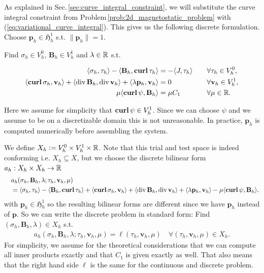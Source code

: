 \documentclass[../master_thesis.tex]{subfiles}
\begin{document}
As explained in Sec.\,\ref{sec:curve_integral_constraint}, 
we will substitute the curve integral constraint from Problem\,\ref{prob:2d_magnetostatic_problem} with 
(\ref{eq:variational_curve_integral}).
This gives us the following discrete formulation. Choose $\mathbf{p}_h \in \mathfrak{H}^1_h$ 
s.t. $\lVert \mathbf{p}_h \rVert = 1$. 

\begin{problem}\label{prob:magnetostatic_problem_discrete_variational}
    Find 
    $\sigma_h \in V_h^0$, $\mathbf{B}_h \in V_h^1$ and $\lambda \in \real$ s.t.

    \begin{align*}
        \langle \sigma_h, \tau_h \rangle - \langle \mathbf{B}_h, \veccurl\tau_h \rangle 
        &=  -\langle J, \tau_h \rangle \quad &&\forall \tau_h \in V_h^0, 
        \\ \langle \veccurl \sigma_h, \mathbf{v}_h \rangle + \langle \diver \mathbf{B}_h, \diver \mathbf{v}_h \rangle 
        + \langle \lambda \mathbf{p}_h, \mathbf{v}_h \rangle 
        &= 0 \quad &&\forall \mathbf{v}_h \in V^1_h, 
        \\ \mu \langle \bm{\curl} \psi, \mathbf{B}_h \rangle &= \mu C_1 \quad &&\forall \mu \in \real.
    \end{align*}
\end{problem}
Here we assume for simplicity that $\veccurl \psi \in V_h^1$. Since 
we can choose $\psi$ and we assume to be on a discretizable domain this is not unreasonable. In practice, $\mathbf{p}_h$ 
is computed numerically before assembling the system. 

We define $X_h \vcentcolon= V_h^0 \times V_h^1 \times \real$. 
Note that this trial and test space is indeed conforming i.e. $X_h \subseteq X$, 
but we choose the discrete bilinear form $a_h:X_h \times X_h \rightarrow \real$
\begin{align*}
    &a_h(\sigma_h,\mathbf{B}_h,\lambda;\tau_h,\mathbf{v}_h,\mu)
    \\ \quad&= \langle \sigma_h, \tau_h \rangle - \langle \mathbf{B}_h, \veccurl\tau_h \rangle
    + \langle \veccurl\sigma_h, \mathbf{v}_h \rangle + \langle \diver \mathbf{B}_h, \diver \mathbf{v}_h \rangle 
    + \langle \lambda \mathbf{p}_h, \mathbf{v}_h \rangle - \mu \langle \veccurl \psi, \mathbf{B}_h \rangle.
\end{align*} 
with $\mathbf{p}_h \in \mathfrak{H}^1_h$ 
so the resulting bilinear forms are different since we have $\mathbf{p}_h$ 
instead of $\mathbf{p}$. So we can write the discrete problem in 
standard form: Find $(\sigma_h,\mathbf{B}_h,\lambda) \in X_h$ s.t.
\begin{align*}
    a_h(\sigma_h,\mathbf{B}_h,\lambda;\tau_h,\mathbf{v}_h,\mu) = \ell(\tau_h,\mathbf{v}_h,\mu) 
    \quad \forall (\tau_h,\mathbf{v}_h,\mu) \in X_h.
\end{align*}
For simplicity, we assume for the theoretical considerations that we can 
compute all inner products exactly and that $C_1$ is 
given exactly as well. That also means that the right hand side $\ell$ is the 
same for the continuous and discrete problem.
\end{document}
